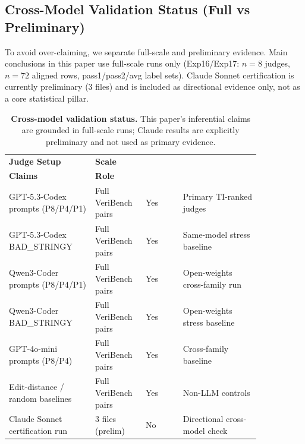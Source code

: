 \documentclass{article}
\begin{document}
\subsection{Cross-Model Validation Status (Full vs Preliminary)}
To avoid over-claiming, we separate full-scale and preliminary evidence.
Main conclusions in this paper use full-scale runs only (Exp16/Exp17: \(n=8\) judges, \(n=72\) aligned rows, pass1/pass2/avg label sets).
Claude Sonnet certification is currently preliminary (\(3\) files) and is included as directional evidence only, not as a core statistical pillar.

\begin{table}[t]
  \centering
  \small
  \begin{tabular}{@{}p{0.30\linewidth}p{0.14\linewidth}p{0.13\linewidth}p{0.27\linewidth}@{}}
    \toprule
    \textbf{Judge Setup}             & \textbf{Scale}       & \makecell[c]{\textbf{In Main}                                 \\\textbf{Claims}} & \textbf{Role} \\
    \midrule
    GPT-5.3-Codex prompts (P8/P4/P1) & Full VeriBench pairs & Yes                           & Primary TI-ranked judges      \\
    GPT-5.3-Codex BAD\_STRINGY       & Full VeriBench pairs & Yes                           & Same-model stress baseline    \\
    Qwen3-Coder prompts (P8/P4/P1)   & Full VeriBench pairs & Yes                           & Open-weights cross-family run \\
    Qwen3-Coder BAD\_STRINGY         & Full VeriBench pairs & Yes                           & Open-weights stress baseline  \\
    GPT-4o-mini prompts (P8/P4)      & Full VeriBench pairs & Yes                           & Cross-family baseline         \\
    Edit-distance / random baselines & Full VeriBench pairs & Yes                           & Non-LLM controls              \\
    Claude Sonnet certification run  & 3 files (prelim)     & No                            & Directional cross-model check \\
    \bottomrule
  \end{tabular}
  \caption{\textbf{Cross-model validation status.}
    This paper's inferential claims are grounded in full-scale runs; Claude results are explicitly preliminary and not used as primary evidence.}
  \label{tab:app-cross-model-status}
\end{table}
\end{document}
